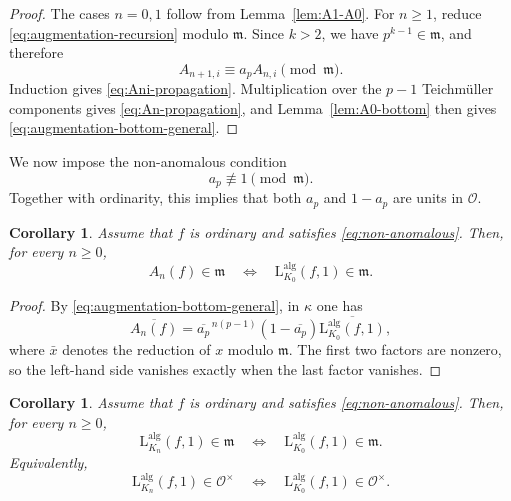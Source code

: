 \documentclass[11pt,table]{amsart}
\newtheorem{corollary}[theorem]{Corollary}
\numberwithin{equation}{section}
\begin{document}
\begin{proof}
The cases \(n=0,1\) follow from Lemma~\ref{lem:A1-A0}. For \(n\geq1\),
reduce \eqref{eq:augmentation-recursion} modulo \(\mathfrak m\). Since
\(k>2\), we have \(p^{k-1}\in\mathfrak m\), and therefore
\[
        A_{n+1,i}
        \equiv
        a_pA_{n,i}
        \pmod{\mathfrak m}.
\]
Induction gives \eqref{eq:Ani-propagation}. Multiplication over the
\(p-1\) Teichm\"uller components gives \eqref{eq:An-propagation}, and
Lemma~\ref{lem:A0-bottom} then gives
\eqref{eq:augmentation-bottom-general}.
\end{proof}

\par We now impose the non-anomalous condition
\begin{equation}
\label{eq:non-anomalous}
        a_p\not\equiv1\pmod{\mathfrak m}.
\end{equation}
Together with ordinarity, this implies that both \(a_p\) and \(1-a_p\)
are units in \(\mathcal O\).

\begin{corollary}
\label{cor:An-bottom-vanishing}
Assume that \(f\) is ordinary and satisfies
\eqref{eq:non-anomalous}. Then, for every \(n\geq0\),
\begin{equation}
\label{eq:An-vanishing-equivalence}
        A_n(f)\in\mathfrak m
        \quad\Longleftrightarrow\quad
        \mathrm{L}_{K_0}^{\operatorname{alg}}(f,1)\in\mathfrak m.
\end{equation}
\end{corollary}

\begin{proof}
By \eqref{eq:augmentation-bottom-general}, in \(\kappa\) one has
\[
        \overline{A_n(f)}
        =
        \overline{a_p}^{\,n(p-1)}
        (1-\overline{a_p})
        \overline{\mathrm{L}_{K_0}^{\operatorname{alg}}(f,1)},
\]
where $\bar{x}$ denotes the reduction of $x$ modulo $\mathfrak{m}$.
The first two factors are nonzero, so the left-hand side vanishes
exactly when the last factor vanishes.
\end{proof}

\begin{corollary}
\label{cor:general-unit-stability}
Assume that \(f\) is ordinary and satisfies
\eqref{eq:non-anomalous}. Then, for every \(n\geq0\),
\begin{equation}
\label{eq:general-unit-stability}
        \mathrm{L}_{K_n}^{\operatorname{alg}}(f,1)\in\mathfrak m
        \quad\Longleftrightarrow\quad
        \mathrm{L}_{K_0}^{\operatorname{alg}}(f,1)\in\mathfrak m.
\end{equation}
Equivalently,
\[
        \mathrm{L}_{K_n}^{\operatorname{alg}}(f,1)\in\mathcal O^\times
        \quad\Longleftrightarrow\quad
        \mathrm{L}_{K_0}^{\operatorname{alg}}(f,1)\in\mathcal O^\times.
\]
\end{corollary}
\end{document}
